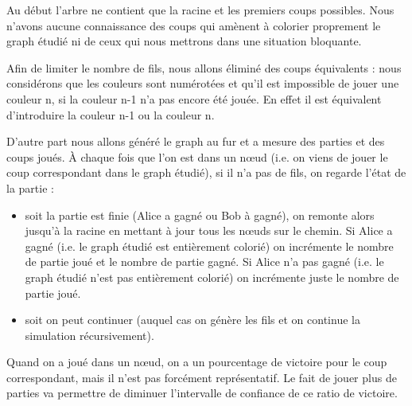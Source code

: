 Au début l’arbre ne contient que la racine et les premiers coups possibles. Nous n’avons aucune connaissance des coups qui amènent à colorier proprement le graph étudié ni de ceux qui nous mettrons  dans une situation bloquante. 

Afin de limiter le nombre de fils, nous allons éliminé des coups équivalents : nous considérons que les couleurs sont numérotées et qu’il est impossible de jouer une couleur n, si la couleur n-1 n’a pas encore été jouée. En effet il est équivalent d’introduire la couleur n-1 ou la couleur n. 

D’autre part nous allons généré le graph au fur et a mesure des parties et des coups joués. À chaque fois que l’on est dans un nœud (i.e. on viens de jouer le coup correspondant dans le graph étudié), si il n’a pas de fils, on regarde l'état de la partie : 
\begin{itemize}
\item soit la partie est finie (Alice a gagné ou Bob à gagné), on remonte alors jusqu’à la racine en mettant à jour tous les nœuds sur le chemin. Si Alice a gagné (i.e. le graph étudié est entièrement colorié) on incrémente le nombre de partie joué et le nombre de partie gagné. Si Alice n’a pas gagné (i.e. le graph étudié n’est pas entièrement colorié)  on incrémente juste le nombre de partie joué.
\item soit on peut continuer (auquel cas on génère les fils et on continue la simulation récursivement).
\end{itemize}
Quand on a joué dans un nœud, on a un pourcentage de victoire pour le coup correspondant, mais il n’est pas forcément représentatif. Le fait de jouer plus de parties va permettre de diminuer l'intervalle de confiance de ce ratio de victoire.

